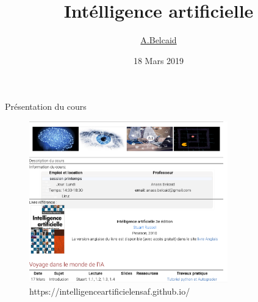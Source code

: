 \documentclass{beamer}
\title{Intélligence artificielle}
\author{\underline{A.Belcaid}}
\institute{Ecole Nationale des Sciences Appliquées Fès}
\date{18 Mars 2019}
\begin{document}
\maketitle



\begin{frame}[t]{Présentation du cours}
  \begin{figure}
    \centering
  \includegraphics[width=\textwidth,height=7cm]{./images/preview_site.png}  
  \caption*{https://intelligenceartificielensaf.github.io/}
\end{figure}
\end{frame}
\end{document}
